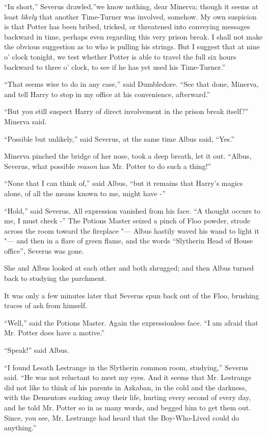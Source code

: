 ``In short,'' Severus drawled,''we know nothing, dear Minerva; though it
seems at least \emph{likely} that another Time-Turner was involved,
somehow. My own suspicion is that Potter has been bribed, tricked, or
threatened into conveying messages backward in time, perhaps even
regarding this very prison break. I shall not make the obvious
suggestion as to who is pulling his strings. But I suggest that at nine
o' clock tonight, we test whether Potter is able to travel the full six
hours backward to three o' clock, to see if he has yet used his
Time-Turner.''

``That seems wise to do in any case,'' said Dumbledore. ``See that done,
Minerva, and tell Harry to stop in my office at his convenience,
afterward.''

``But you still suspect Harry of direct involvement in the prison break
itself?'' Minerva said.

``Possible but unlikely,'' said Severus, at the same time Albus said,
``Yes.''

Minerva pinched the bridge of her nose, took a deep breath, let it out.
``Albus, Severus, what possible \emph{reason} has Mr. Potter to do such a
thing!''

``None that I can think of,'' said Albus, ``but it remains that Harry's
magics alone, of all the means known to me, might have -''

``Hold,'' said Severus. All expression vanished from his face. ``A
thought occurs to me, I must check -'' The Potions Master seized a pinch
of Floo powder, strode across the room toward the fireplace "--- Albus
hastily waved his wand to light it "--- and then in a flare of green flame,
and the words ``Slytherin Head of House office'', Severus was gone.

She and Albus looked at each other and both shrugged; and then Albus
turned back to studying the parchment.

It was only a few minutes later that Severus spun back out of the Floo,
brushing traces of ash from himself.

``Well,'' said the Potions Master. Again the expressionless face. ``I am
afraid that Mr. Potter does have a motive.''

``Speak!'' said Albus.

``I found Lesath Lestrange in the Slytherin common room, studying,''
Severus said. ``He was not reluctant to meet my eyes. And it seems that
Mr. Lestrange did not like to think of his parents in Azkaban, in the
cold and the darkness, with the Dementors sucking away their life,
hurting every second of every day, and he told Mr. Potter so in as many
words, and begged him to get them out. Since, you see, Mr. Lestrange had
heard that the Boy-Who-Lived could do anything.''

